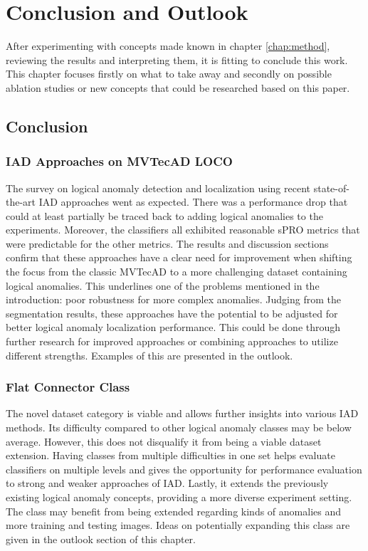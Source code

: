 \chapter{Conclusion and Outlook}
\label{chap:conclusion}


After experimenting with concepts made known in chapter \ref{chap:method}, reviewing the results and interpreting them, it is 
fitting to conclude this work. This chapter focuses firstly on what to take away and secondly on 
possible ablation studies or new concepts that could be researched based on this paper.


\section{Conclusion}
\label{sec:realconclusion}

\subsection{IAD Approaches on MVTecAD LOCO}
The survey on logical anomaly detection and localization using recent state-of-the-art IAD approaches went as expected. There was a performance drop that could at least 
partially be traced back to adding logical anomalies to the experiments. Moreover, the classifiers all exhibited reasonable sPRO metrics that were predictable for the 
other metrics. The results and discussion sections confirm that these approaches have a clear need for improvement when shifting the focus from the classic MVTecAD \cite{MVTEC_Bergmann_2021} 
to a more challenging dataset containing logical anomalies. This underlines one of the problems mentioned in the introduction: poor robustness for more complex anomalies. \newline
Judging from the segmentation results, these approaches have the potential to be adjusted for better logical anomaly localization performance. This could be done through 
further research for improved approaches or combining approaches to utilize different strengths. Examples of this are presented in the outlook.

\subsection{Flat Connector Class}
The novel dataset category is viable and allows further insights into various IAD methods. Its difficulty compared to other logical anomaly classes may be 
below average. However, this does not disqualify it from being a viable dataset extension. Having classes from multiple difficulties in one set helps evaluate classifiers on 
multiple levels and gives the opportunity for performance evaluation to strong and weaker approaches of IAD. Lastly, it extends the previously existing logical anomaly 
concepts, providing a more diverse experiment setting. \newline
The class may benefit from being extended regarding kinds of anomalies and more training and testing images. Ideas on potentially expanding this class are given 
in the outlook section of this chapter.

